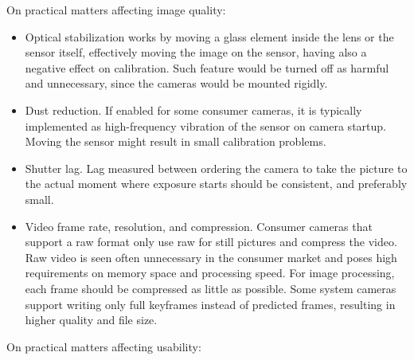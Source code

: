 On practical matters affecting image quality:

\begin{itemize}
	\item Optical stabilization works by moving a glass element inside the lens or the sensor itself, effectively moving the image on the sensor, having also a negative effect on calibration.
		Such feature would be turned off as harmful and unnecessary, since the cameras would be mounted rigidly.

	\item Dust reduction.
		If enabled for some consumer cameras, it is typically implemented as high-frequency vibration of the sensor on camera startup.
		Moving the sensor might result in small calibration problems.

	\item Shutter lag.
		Lag measured between ordering the camera to take the picture to the actual moment where exposure starts should be consistent, and preferably small.

	\item Video frame rate, resolution, and compression.
		Consumer cameras that support a raw format only use raw for still pictures and compress the video.
		Raw video is seen often unnecessary in the consumer market and poses high requirements on memory space and processing speed.
		For image processing, each frame should be compressed as little as possible.
		Some system cameras support writing only full keyframes instead of predicted frames, resulting in higher quality and file size.

\end{itemize}

On practical matters affecting usability:


